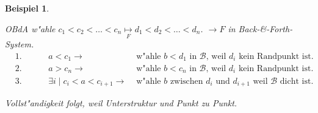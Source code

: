 \documentclass[a4paper,12pt,numbers=noenddot,parskip=full]{scrartcl}
\newcommand{\scrB}{\mathcal{B}}
\theoremstyle{dotless}
\newtheorem{example}[theorem]{Beispiel}
\theoremstyle{remark}
\begin{document}
\begin{example}
\begin{enumerate}
		OBdA w"ahle $c_1<c_2<\dots<c_n \underset{F}{\mapsto} d_1<d_2<\dots<d_n$. $\longrightarrow F$ in Back-\&-Forth-System.
		\begin{align*}
			&\text{1. Fall: } &a< c_1 \rightarrow &\text{ w"ahle } b<d_1 \text{ in } \scrB \text{, weil } d_i \text{ kein Randpunkt ist.}\\
			&\text{2. Fall: } &a>c_n \rightarrow &\text{ w"ahle } b<c_n \text{ in } \scrB \text{, weil } d_i \text{ kein Randpunkt ist.}\\
			&\text{3. Fall: } &\exists i \mid c_i<a<c_{i+1} \rightarrow &\text{ w"ahle } b \text{ zwischen } d_i \text{ und } d_{i+1} \text{ weil } \scrB \text{ dicht ist.}
		\end{align*}
		
		Vollst"andigkeit folgt, weil Unterstruktur und Punkt zu Punkt.
	\end{enumerate}
\end{example}
\end{document}
